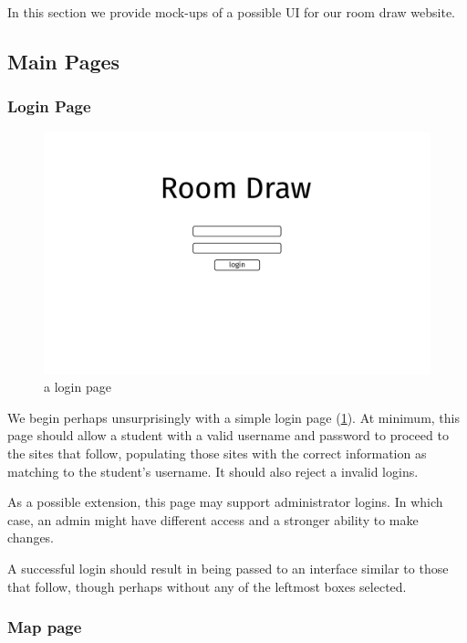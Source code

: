 In this section we provide mock-ups of a possible UI for our room draw website.

\subsection{Main Pages}
\subsubsection{Login Page}

\begin{figure}[H] \centering
\includegraphics[scale=.15]{wireframe/login}
\caption{a login page}
\label{fig:wirelogin}
\end{figure}

We begin perhaps unsurprisingly with a simple login page (\cref{fig:wirelogin}).
At minimum, this page should allow a student with a valid username and password
to proceed to the sites that follow, populating those sites with the correct
information as matching to the student's username. It should also reject a
invalid logins.

As a possible extension, this page may support administrator logins. In which
case, an admin might have different access and a stronger ability to make
changes.

A successful login should result in being passed to an interface similar to
those that follow, though perhaps without any of the leftmost boxes selected.

\subsubsection{Map page}

